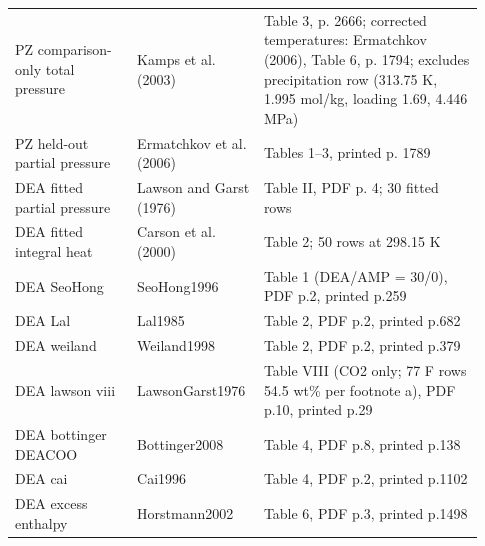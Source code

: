 \begin{longtable}{@{}>{\raggedright\arraybackslash}p{0.25\linewidth}>{\raggedright\arraybackslash}p{0.23\linewidth}>{\raggedright\arraybackslash}p{0.45\linewidth}@{}}
PZ comparison-only total pressure & Kamps et al. (2003) \cite{kampsSolubilityCO2H2O+piperazine2003a} & Table 3, p. 2666; corrected temperatures: Ermatchkov (2006), Table 6, p. 1794; excludes precipitation row (313.75 K, 1.995 mol/kg, loading 1.69, 4.446 MPa) \\
PZ held-out partial pressure & Ermatchkov et al. (2006) \cite{ermatchkovSolubilityCarbonDioxide2006a} & Tables 1--3, printed p. 1789 \\
DEA fitted partial pressure & Lawson and Garst (1976) \cite{lawsonGasSweeteningData1976} & Table II, PDF p. 4; 30 fitted rows \\
DEA fitted integral heat & Carson et al. (2000) \cite{carsonEnthalpySolutionCarbon2000} & Table 2; 50 rows at 298.15 K \\
DEA SeoHong & SeoHong1996 \cite{seoSolubilitiesCarbonDioxide1996} & Table 1 (DEA/AMP = 30/0), PDF p.2, printed p.259 \\
DEA Lal & Lal1985 \cite{lalSolubilityH2SCO21985} & Table 2, PDF p.2, printed p.682 \\
DEA weiland & Weiland1998 \cite{Weiland1998} & Table 2, PDF p.2, printed p.379 \\
DEA lawson viii & LawsonGarst1976 \cite{lawsonGasSweeteningData1976} & Table VIII (CO2 only; 77 F rows 54.5 wt\% per footnote a), PDF p.10, printed p.29 \\
DEA bottinger DEACOO & Bottinger2008 \cite{Bottinger2008} & Table 4, PDF p.8, printed p.138 \\
DEA cai & Cai1996 \cite{caiBinaryIsobaricVaporLiquid1996} & Table 4, PDF p.2, printed p.1102 \\
DEA excess enthalpy & Horstmann2002 \cite{horstmannPhaseEquilibriumExcess2002} & Table 6, PDF p.3, printed p.1498 \\
\end{longtable}\endgroup
